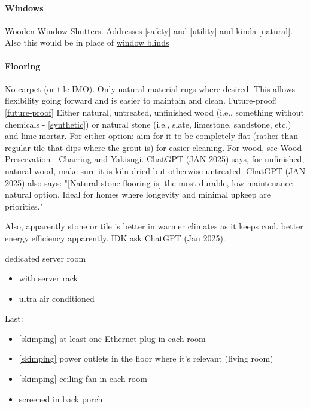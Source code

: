 \documentclass{article}
\begin{document}
\paragraph{Windows}
Wooden \href{https://en.wikipedia.org/wiki/Window_shutter}{Window Shutters}. Addresses \ref{safety} and \ref{utility} and kinda \ref{natural}. Also this would be in place of \href{https://en.wikipedia.org/wiki/Window_blind}{window blinds}

\paragraph{Flooring}
No carpet (or tile IMO). Only natural material rugs where desired. This allows flexibility going forward and is easier to maintain and clean. Future-proof! \ref{future-proof}
Either natural, untreated, unfinished wood (i.e., something without chemicals - \ref{synthetic}) or natural stone (i.e., slate, limestone, sandstone, etc.) and \href{https://en.wikipedia.org/wiki/Lime_mortar}{lime mortar}. For either option: aim for it to be completely flat (rather than regular tile that dips where the grout is) for easier cleaning. For wood, see \href{https://en.wikipedia.org/wiki/Wood_preservation#Charring}{Wood Preservation - Charring} and \href{https://en.wikipedia.org/wiki/Yakisugi}{Yakisugi}.
ChatGPT (JAN 2025) says, for unfinished, natural wood, make sure it is kiln-dried but otherwise untreated. ChatGPT (JAN 2025) also says: "[Natural stone flooring is] the most durable, low-maintenance natural option. Ideal for homes where longevity and minimal upkeep are priorities."

Also, apparently stone or tile is better in warmer climates as it keeps cool. better energy efficiency apparently. IDK ask ChatGPT (Jan 2025).

dedicated server room
\begin{itemize}
    \item with server rack
    \item ultra air conditioned
\end{itemize}

Last:
\begin{itemize}

\item \ref{skimping} at least one Ethernet plug in each room
\item \ref{skimping} power outlets in the floor where it's relevant (living room)
\item \ref{skimping} ceiling fan in each room
\item screened in back porch
\end{itemize}
\end{document}
